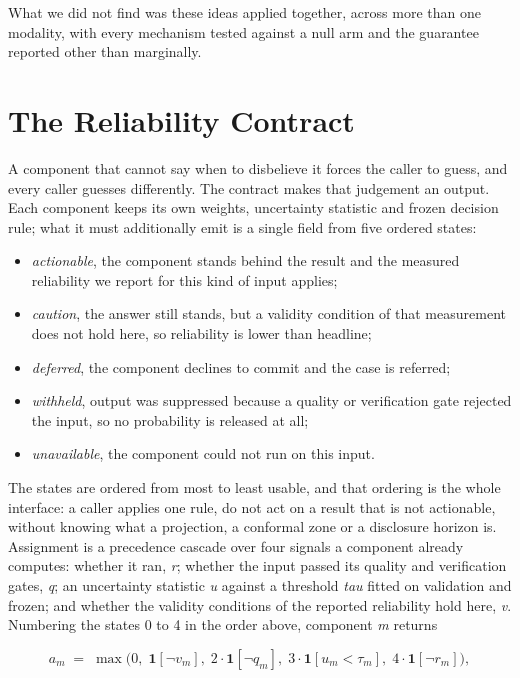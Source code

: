 \documentclass[conference,a4paper]{IEEEtran}
\begin{document}
What we did not find was these ideas applied together, across more than one modality, with every mechanism tested against a null arm and the guarantee reported other than marginally.

\section{The Reliability Contract}
A component that cannot say when to disbelieve it forces the caller to guess, and every caller guesses differently. The contract makes that judgement an output. Each component keeps its own weights, uncertainty statistic and frozen decision rule; what it must additionally emit is a single field from five ordered states:

\begin{itemize}
\item \textit{actionable}, the component stands behind the result and the measured reliability we report for this kind of input applies;
\item \textit{caution}, the answer still stands, but a validity condition of that measurement does not hold here, so reliability is lower than headline;
\item \textit{deferred}, the component declines to commit and the case is referred;
\item \textit{withheld}, output was suppressed because a quality or verification gate rejected the input, so no probability is released at all;
\item \textit{unavailable}, the component could not run on this input.
\end{itemize}

The states are ordered from most to least usable, and that ordering is the whole interface: a caller applies one rule, do not act on a result that is not actionable, without knowing what a projection, a conformal zone or a disclosure horizon is. Assignment is a precedence cascade over four signals a component already computes: whether it ran, \textit{r}; whether the input passed its quality and verification gates, \textit{q}; an uncertainty statistic \textit{u} against a threshold \textit{tau} fitted on validation and frozen; and whether the validity conditions of the reported reliability hold here, \textit{v}. Numbering the states 0 to 4 in the order above, component \textit{m} returns

\begin{equation}
a_m \;=\; \max\!\bigl(0,\; \mathbf{1}[\neg v_m],\; 2\cdot\mathbf{1}[\neg q_m],\; 3\cdot\mathbf{1}[u_m < \tau_m],\; 4\cdot\mathbf{1}[\neg r_m]\bigr),
\end{equation}
\end{document}
